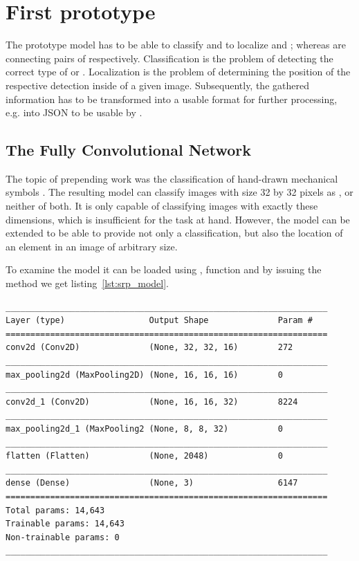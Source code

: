 \section{First prototype} \label{ch:first_prototype}

The prototype model has to be able to classify and to localize  and ; whereas  are connecting pairs of  respectively.
Classification is the problem of detecting the correct type of  or . %
Localization is the problem of determining the position of the respective detection inside of a given image. %
Subsequently, the gathered information has to be transformed into a usable format for further processing, e.g. into JSON to be usable by . %

\subsection{The Fully Convolutional Network}\label{ch:fcn}

The topic of prepending work was the classification of hand-drawn mechanical symbols \cite{Lawrence2020}.
The resulting model can classify images with size 32 by 32 pixels as ,  or neither of both.
It is only capable of classifying images with exactly these dimensions, which is insufficient for the task at hand.
However, the model can be extended to be able to provide not only a classification, but also the location of an element in an image of arbitrary size.

To examine the model it can be loaded using , %
 function and by issuing the  method we get listing~\ref{lst:srp_model}.

\begin{lstlisting}[caption={Summary of Symbol Classifier.}, label={lst:srp_model}]
_________________________________________________________________
Layer (type)                 Output Shape              Param #
=================================================================
conv2d (Conv2D)              (None, 32, 32, 16)        272
_________________________________________________________________
max_pooling2d (MaxPooling2D) (None, 16, 16, 16)        0
_________________________________________________________________
conv2d_1 (Conv2D)            (None, 16, 16, 32)        8224
_________________________________________________________________
max_pooling2d_1 (MaxPooling2 (None, 8, 8, 32)          0
_________________________________________________________________
flatten (Flatten)            (None, 2048)              0
_________________________________________________________________
dense (Dense)                (None, 3)                 6147
=================================================================
Total params: 14,643
Trainable params: 14,643
Non-trainable params: 0
_________________________________________________________________
\end{lstlisting}

